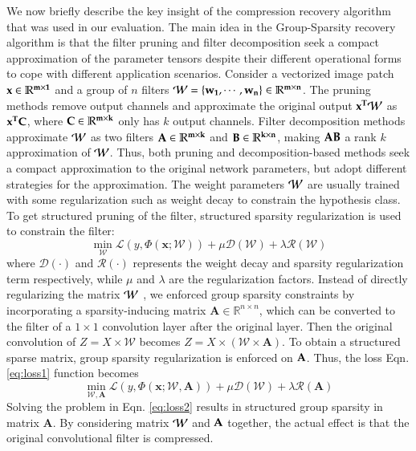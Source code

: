 We now briefly describe the key insight of the compression recovery algorithm that was used in our evaluation.
The main idea in the Group-Sparsity recovery algorithm \cite{li2020group} is that the filter pruning and filter decomposition seek a compact
approximation of the parameter tensors despite their different operational forms to cope with different application scenarios.
%
Consider a vectorized image patch  $\bf{x} \in \mathbb{R}^{m \times 1}$
and a group of $n$ filters $\bf{\mathcal{W}} = \{\bf{w_1}, \cdots , \bf{w_n}\} \in \mathbb{R}^{m \times n}$.
%
The pruning methods remove output channels and approximate the original output $\bf{x}^T \bf{\mathcal{W}}$ as $\bf{x}^T \bf{C}$, where $\bf{C} \in \mathbb{R}^{m \times k}$ only has
$k$ output channels. Filter decomposition methods approximate $\bf{\mathcal{W}}$ as two filters $\bf{A} \in \mathbb{R}^{m\times k}$
and $\bf{B} \in \mathbb{R}^{k \times n}$, making $\bf{AB}$
a rank $k$ approximation of $\bf{\mathcal{W}}$. 
%
Thus, both pruning and decomposition-based methods seek a compact approximation to the original network parameters, but adopt different strategies for the approximation.
%
%
The weight parameters $\bf{\mathcal{W}}$ are usually trained with some regularization 
such as weight decay to constrain the hypothesis class.
%
To get structured pruning of the filter, structured sparsity regularization 
is used to constrain the filter:
\begin{equation}
\min _{\mathcal{W}} \mathcal{L}(y, \Phi(\mathbf{x} ; \mathcal{W}))+\mu \mathcal{D}(\mathcal{W})+\lambda \mathcal{R}(\mathcal{W})
\label{eq:loss1}
\end{equation}
%
where $\mathcal{D}(\cdot)$ and $\mathcal{R}(\cdot)$ represents the weight decay and 
sparsity regularization term respectively, while $\mu$ and $\lambda$ are the regularization factors.
%
Instead of directly regularizing the matrix $\bf{\mathcal{W}}$ \cite{yoon2017combined, li2019oicsr}, we enforced group sparsity constraints by incorporating a sparsity-inducing matrix $\mathbf{A} \in \mathbb{R}^{n \times n}$, which can be converted to the filter of a $1 \times 1$ convolution layer after the original layer.
%
%
Then the original convolution of 
$Z = X \times \mathcal{W}$ becomes 
$Z = X \times (\mathcal{W} \times \mathbf{A})$.
%
To obtain a structured sparse matrix, group sparsity regularization is enforced on $\bf{A}$. Thus, the loss Eqn. \ref{eq:loss1} function becomes
%
\begin{equation}
\min _{\mathcal{W}, \mathbf{A}} \mathcal{L}(y, \Phi(\mathbf{x} ; \mathcal{W}, \mathbf{A}))+\mu \mathcal{D}(\mathcal{W})+\lambda \mathcal{R}(\mathbf{A})
\label{eq:loss2}
\end{equation}
%
Solving the problem in Eqn. \ref{eq:loss2} results in structured group
sparsity in matrix $\textbf{A}$. By considering matrix $\bf{\mathcal{W}}$ and $\bf{A}$ together, the actual effect is that the original convolutional
filter is compressed.

